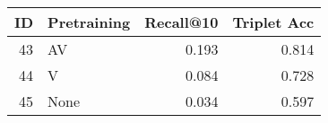 \begin{tabular}{rlrr}
\toprule
 ID & Pretraining &  Recall@10 &  Triplet Acc \\
\midrule
 43 &          AV &      0.193 &        0.814 \\
 44 &           V &      0.084 &        0.728 \\
 45 &        None &      0.034 &        0.597 \\
\bottomrule
\end{tabular}
